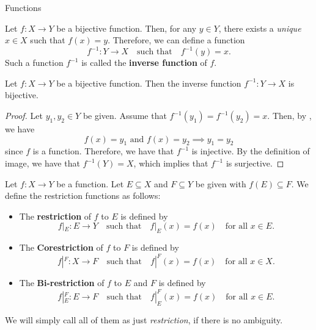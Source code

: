 \begin{section}{Functions}
\bigskip

\begin{definition} \label{def:InverseFunction}
    Let $f: X \to Y$ be a bijective function. Then, for any $y \in Y$, there exists a
    \emph{unique} $x \in X$ such that $f(x) = y$. Therefore, we can define a function
    \[
    f^{-1}: Y \to X \quad \text{such that} \quad f^{-1}(y) = x.
    \]
    Such a function $f^{-1}$ is called the \textbf{inverse function} of $f$.
\end{definition}

\bigskip

\begin{theorem} \label{thm:InverseFunctionIsBijection}
    Let $f: X \to Y$ be a bijective function. Then the inverse function $f^{-1}: Y \to X$ is bijective.
\end{theorem}

\begin{proof}
    Let $y_1, y_2 \in Y$ be given. Assume that $f^{-1}(y_1) = f^{-1}(y_2) = x$. Then, by ,
    we have
    \[
    f(x) = y_1 \text{ and } f(x) = y_2 \implies y_1 = y_2
    \]
    since $f$ is a function. Therefore, we have that $f^{-1}$ is injective.
    By the definition of image, we have that $f^{-1}(Y) = X$, which implies that $f^{-1}$ is surjective.
\end{proof}

\bigskip

\begin{definition} \label{def:RestrictionFunction}
    Let $f: X \to Y$ be a function. Let $E \subseteq X$ and $F \subseteq Y$ be given with $f(E) \subseteq F$.
    We define the restriction functions as follows:
    \begin{itemize}
        \item The \textbf{restriction} of $f$ to $E$ is defined by
        \[
        f|_{E}: E \to Y \quad \text{such that} \quad f|_{E}(x) = f(x) \quad \text{for all } x \in E.
        \]
        \item The \textbf{Corestriction} of $f$ to $F$ is defined by
        \[
        f|^{F}: X \to F \quad \text{such that} \quad f|^{F}(x) = f(x) \quad \text{for all } x \in X.
        \]
        \item The \textbf{Bi-restriction} of $f$ to $E$ and $F$ is defined by
        \[
        f|_{E}^{F}: E \to F \quad \text{such that} \quad f|_{E}^{F}(x) = f(x) \quad \text{for all } x \in E.
        \]
    \end{itemize}
    We will simply call all of them as just \emph{restriction}, if there is no ambiguity.
\end{definition}


\end{section}
